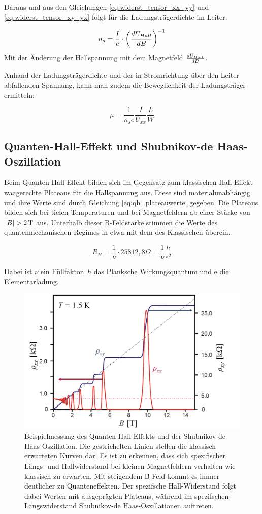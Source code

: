 Daraus und aus den Gleichungen \ref{eq:widerst_tensor_xx_yy} und \ref{eq:widerst_tensor_xy_yx} folgt für die Ladungsträgerdichte im Leiter:
 
 \begin{equation}
 n_s=\frac{I}{e} \cdot \left( \frac{d U_{Hall}}{d B} \right)^{-1}
 \label{eq:ladungsdichte_steig}
 \end{equation}
 Mit der Änderung der Hallspannung mit dem Magnetfeld $\frac{d U_{Hall}}{d B}$. 
 
 Anhand der Ladungsträgerdichte und der in Stromrichtung über den Leiter abfallenden Spannung, kann man zudem die Beweglichkeit der Ladungsträger ermitteln:
 
 \begin{equation}
 \mu=\frac{1}{n_se}\frac{I}{U_{xx}}\frac{L}{W}
 \label{eq:bewegl_masse}
 \end{equation}

\newpage
\subsection{Quanten-Hall-Effekt und Shubnikov-de Haas-Oszillation}

Beim Quanten-Hall-Effekt bilden sich im Gegensatz zum klassischen Hall-Effekt waagerechte Plateaus für die Hallspannung aus. Diese sind materialunabhängig und ihre Werte sind durch Gleichung \ref{eq:qh_plateauwerte} gegeben. Die Plateaus bilden sich bei tiefen Temperaturen und bei Magnetfeldern ab einer Stärke von $|B| > \unit[2]{T}$ aus. Unterhalb dieser B-Feldstärke stimmen die Werte des quantenmechanischen Regimes in etwa mit dem des Klassischen überein. 

\begin{equation}
R_H=\frac{1}{\nu}\cdot 25812,8\Omega =\frac{1}{\nu} \frac{h}{e^2}
\label{eq:qh_plateauwerte}
\end{equation}

Dabei ist $\nu$ ein Füllfaktor, $h$ das Planksche Wirkungsquantum und e die Elementarladung. 

\begin{figure}[h]
\centering
\includegraphics[width=0.5\linewidth]{images/Anleitungsheft/QH_Bsp_Messung_Anleitungsheft}
\caption[Beispiel-Messung Hall-Plateaus und SDH-Oszillation]{Beispielmessung des Quanten-Hall-Effekts und der Shubnikov-de Haas-Oszillation. Die gestrichelten Linien stellen die klassisch erwarteten Kurven dar. Es ist zu erkennen, dass sich spezifischer Längs- und Hallwiderstand bei kleinen Magnetfeldern verhalten wie klassisch zu erwarten. Mit steigendem B-Feld kommt es immer deutlicher zu Quanteneffekten. Der spezifsche Hall-Widerstand folgt dabei Werten mit ausgeprägten Plateaus, während im spezifschen Längswiderstand Shubnikov-de Haas-Oszillationen auftreten.}
\label{fig:QH_Bsp_Messung_Anleitungsheft}
\end{figure}

